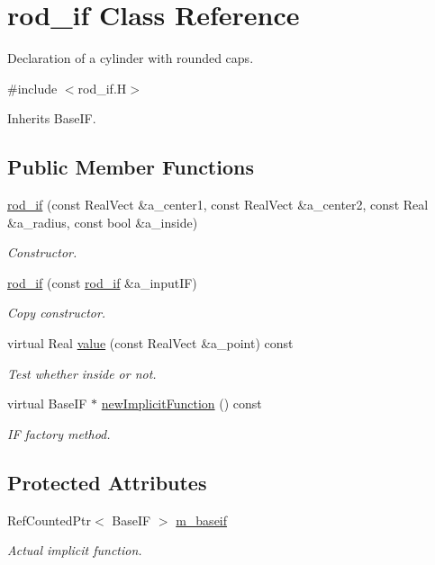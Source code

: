 \hypertarget{classrod__if}{}\section{rod\+\_\+if Class Reference}
\label{classrod__if}


Declaration of a cylinder with rounded caps.  




{\ttfamily \#include $<$rod\+\_\+if.\+H$>$}



Inherits Base\+IF.

\subsection*{Public Member Functions}
\begin{DoxyCompactItemize}
\item 
\hyperlink{classrod__if_a3c184364057d19cbf9e5523c1aeb7ccc}{rod\+\_\+if} (const Real\+Vect \&a\+\_\+center1, const Real\+Vect \&a\+\_\+center2, const Real \&a\+\_\+radius, const bool \&a\+\_\+inside)
\begin{DoxyCompactList}\small\item\em Constructor. \end{DoxyCompactList}\item 
\hyperlink{classrod__if_a1f2ca195eae127c7e63565ab7184689a}{rod\+\_\+if} (const \hyperlink{classrod__if}{rod\+\_\+if} \&a\+\_\+input\+IF)
\begin{DoxyCompactList}\small\item\em Copy constructor. \end{DoxyCompactList}\item 
virtual Real \hyperlink{classrod__if_afb2dda31026a9cb275c0ff65a9975b8d}{value} (const Real\+Vect \&a\+\_\+point) const 
\begin{DoxyCompactList}\small\item\em Test whether inside or not. \end{DoxyCompactList}\item 
virtual Base\+IF $\ast$ \hyperlink{classrod__if_a11c1d7497e2423721d518bf2c273c2b9}{new\+Implicit\+Function} () const 
\begin{DoxyCompactList}\small\item\em IF factory method. \end{DoxyCompactList}\end{DoxyCompactItemize}
\subsection*{Protected Attributes}
\begin{DoxyCompactItemize}
\item 
Ref\+Counted\+Ptr$<$ Base\+IF $>$ \hyperlink{classrod__if_afb29c7f7ac38e19390caffd145df14ad}{m\+\_\+baseif}
\begin{DoxyCompactList}\small\item\em Actual implicit function. \end{DoxyCompactList}\end{DoxyCompactItemize}



